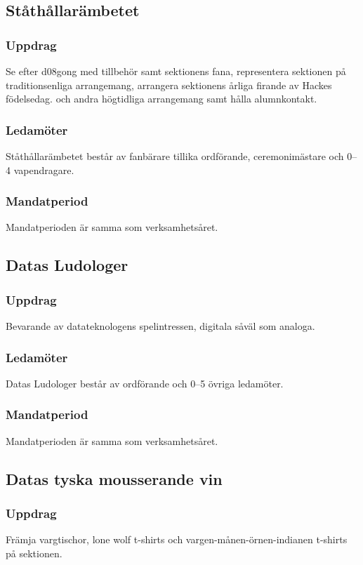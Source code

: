 \subsection{Ståthållarämbetet}
\subsubsection{Uppdrag}
Se efter d08gong med tillbehör samt sektionens fana, representera sektionen på traditionsenliga arrangemang, arrangera sektionens årliga firande av Hackes födelsedag.
och andra högtidliga arrangemang samt hålla alumnkontakt.
\subsubsection{Ledamöter}
Ståthållarämbetet består av fanbärare tillika ordförande, ceremonimästare och 0--4 vapendragare.
\subsubsection{Mandatperiod}
Mandatperioden är samma som verksamhetsåret. 

\subsection{Datas Ludologer}
\subsubsection{Uppdrag}
Bevarande av datateknologens spelintressen, digitala såväl som analoga.
\subsubsection{Ledamöter}
Datas Ludologer består av ordförande och 0--5 övriga ledamöter.
\subsubsection{Mandatperiod}
Mandatperioden är samma som verksamhetsåret. 

\subsection{Datas tyska mousserande vin}
\subsubsection{Uppdrag}
Främja vargtischor, lone wolf t-shirts och vargen-månen-örnen-indianen t-shirts på sektionen.

